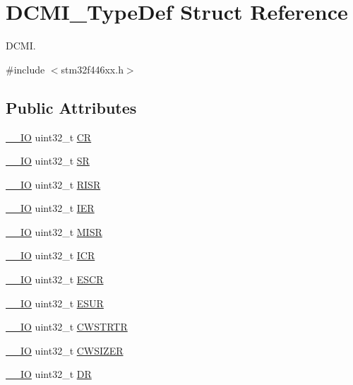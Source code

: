 \hypertarget{struct_d_c_m_i___type_def}{}\section{D\+C\+M\+I\+\_\+\+Type\+Def Struct Reference}
\label{struct_d_c_m_i___type_def}


D\+C\+MI.  




{\ttfamily \#include $<$stm32f446xx.\+h$>$}

\subsection*{Public Attributes}
\begin{DoxyCompactItemize}
\item 
\hyperlink{core__sc300_8h_aec43007d9998a0a0e01faede4133d6be}{\+\_\+\+\_\+\+IO} uint32\+\_\+t \hyperlink{struct_d_c_m_i___type_def_a3cfcc9860ca551cbcb10c1c3dd4304f0}{CR}
\item 
\hyperlink{core__sc300_8h_aec43007d9998a0a0e01faede4133d6be}{\+\_\+\+\_\+\+IO} uint32\+\_\+t \hyperlink{struct_d_c_m_i___type_def_a1bbe4b3cc5d9552526bec462b42164d5}{SR}
\item 
\hyperlink{core__sc300_8h_aec43007d9998a0a0e01faede4133d6be}{\+\_\+\+\_\+\+IO} uint32\+\_\+t \hyperlink{struct_d_c_m_i___type_def_ae0aba9f38498cccbe0186b7813825026}{R\+I\+SR}
\item 
\hyperlink{core__sc300_8h_aec43007d9998a0a0e01faede4133d6be}{\+\_\+\+\_\+\+IO} uint32\+\_\+t \hyperlink{struct_d_c_m_i___type_def_a91ce93b57d8382147574c678ee497c63}{I\+ER}
\item 
\hyperlink{core__sc300_8h_aec43007d9998a0a0e01faede4133d6be}{\+\_\+\+\_\+\+IO} uint32\+\_\+t \hyperlink{struct_d_c_m_i___type_def_ab367c4ca2e8ac87238692e6d55d622ec}{M\+I\+SR}
\item 
\hyperlink{core__sc300_8h_aec43007d9998a0a0e01faede4133d6be}{\+\_\+\+\_\+\+IO} uint32\+\_\+t \hyperlink{struct_d_c_m_i___type_def_a0371fc07916e3043e1151eaa97e172c9}{I\+CR}
\item 
\hyperlink{core__sc300_8h_aec43007d9998a0a0e01faede4133d6be}{\+\_\+\+\_\+\+IO} uint32\+\_\+t \hyperlink{struct_d_c_m_i___type_def_a52c16b920a3f25fda961d0cd29749433}{E\+S\+CR}
\item 
\hyperlink{core__sc300_8h_aec43007d9998a0a0e01faede4133d6be}{\+\_\+\+\_\+\+IO} uint32\+\_\+t \hyperlink{struct_d_c_m_i___type_def_af00a94620e33f4eff74430ff25c12b94}{E\+S\+UR}
\item 
\hyperlink{core__sc300_8h_aec43007d9998a0a0e01faede4133d6be}{\+\_\+\+\_\+\+IO} uint32\+\_\+t \hyperlink{struct_d_c_m_i___type_def_a4d58830323e567117c12ae3feac613b9}{C\+W\+S\+T\+R\+TR}
\item 
\hyperlink{core__sc300_8h_aec43007d9998a0a0e01faede4133d6be}{\+\_\+\+\_\+\+IO} uint32\+\_\+t \hyperlink{struct_d_c_m_i___type_def_a1b9c8048339e19b110ecfbea486f55df}{C\+W\+S\+I\+Z\+ER}
\item 
\hyperlink{core__sc300_8h_aec43007d9998a0a0e01faede4133d6be}{\+\_\+\+\_\+\+IO} uint32\+\_\+t \hyperlink{struct_d_c_m_i___type_def_a266cec1031b0be730b0e35523f5e2934}{DR}
\end{DoxyCompactItemize}


